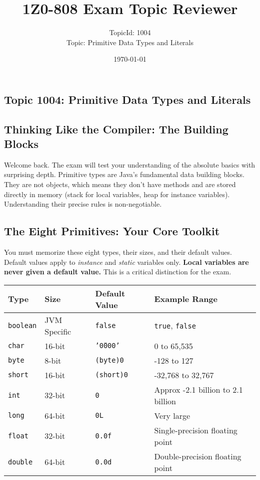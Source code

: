 \documentclass[12pt]{article}
\title{\textbf{1Z0-808 Exam Topic Reviewer}}
\author{TopicId: 1004 \\ Topic: Primitive Data Types and Literals}
\date{\today}
\begin{document}
\maketitle
\newpage\begin{enumerate}[label=(\arabic*)]
\section*{Topic 1004: Primitive Data Types and Literals}

\subsection*{Thinking Like the Compiler: The Building Blocks}
Welcome back. The exam will test your understanding of the absolute basics with surprising depth. Primitive types are Java's fundamental data building blocks. They are not objects, which means they don't have methods and are stored directly in memory (stack for local variables, heap for instance variables). Understanding their precise rules is non-negotiable.

\subsection*{The Eight Primitives: Your Core Toolkit}
You must memorize these eight types, their sizes, and their default values. Default values apply to \textit{instance} and \textit{static} variables only. \textbf{Local variables are never given a default value.} This is a critical distinction for the exam.

\begin{tabular}{|l|l|l|l|}
\hline
\textbf{Type} & \textbf{Size} & \textbf{Default Value} & \textbf{Example Range} \\
\hline
\texttt{boolean} & JVM Specific & \texttt{false} & \texttt{true}, \texttt{false} \\
\texttt{char} & 16-bit & \texttt{'\u0000'} & 0 to 65,535 \\
\hline
\texttt{byte} & 8-bit & \texttt{(byte)0} & -128 to 127 \\
\texttt{short} & 16-bit & \texttt{(short)0} & -32,768 to 32,767 \\
\texttt{int} & 32-bit & \texttt{0} & Approx -2.1 billion to 2.1 billion \\
\texttt{long} & 64-bit & \texttt{0L} & Very large \\
\hline
\texttt{float} & 32-bit & \texttt{0.0f} & Single-precision floating point \\
\texttt{double} & 64-bit & \texttt{0.0d} & Double-precision floating point \\
\hline
\end{tabular}


\end{enumerate}
\end{document}
